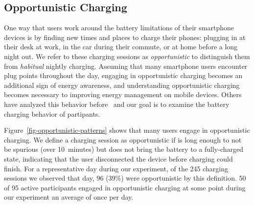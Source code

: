 \subsection{Opportunistic Charging}
\label{subsec-opportunistic}

One way that users work around the battery limitations of their smartphone
devices is by finding new times and places to charge their phones: plugging
in at their desk at work, in the car during their commute, or at home before
a long night out. We refer to these charging sessions as
\textit{opportunistic} to distinguish them from \textit{habitual} nightly
charging. Assuming that many smartphone users encounter plug points
throughout the day, engaging in opportunistic charging becomes an additional
sign of energy awareness, and understanding opportunistic charging becomes
necessary to improving energy management on mobile devices. Others have analyzed
this behavior before~\cite{banerjee:ubicomp:2007, rahmati:mobilehci:2007} and
our goal is to examine the battery charging behavior of \PhoneLab{} partipants.

Figure~\ref{fig-opportunistic-patterns} shows that many users engage in
opportunistic charging. We define a charging session as opportunistic if is
long enough to not be spurious (over 10~minutes) but does not bring the
battery to a fully-charged state, indicating that the user disconnected the
device before charging could finish. For a representative day during our
experiment, of the 245 charging sessions we observed that day, 96 (39\%) were
opportunistic by this definition. 50 of 95 active participants engaged in
opportunistic charging at some point during our experiment an average of once
per day.

